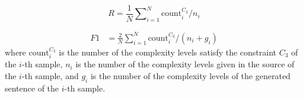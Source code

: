 \documentclass[11pt]{article}
\begin{document}
\begin{itemize}
\begin{equation}
R=\frac{1}{N}\sum\nolimits_{i=1}^{N}{\mathrm{count}_i^{C_3}}\big/{n_i}
\end{equation}

\begin{equation}
\begin{aligned}
F1&=\frac{2}{N}\sum\nolimits_{i=1}^{N}{\mathrm{count}_i^{C_3}}\big/({n_i}+{g_i})
\end{aligned}
\end{equation}
where $\mathrm{count}_i^{C_3}$ is the number of the complexity levels satisfy the constraint $C_3$ of the $i$-th sample, $n_i$ is the number of the complexity levels given in the source  of the $i$-th sample, and $g_i$ is the number of the complexity levels of the generated sentence of the $i$-th sample.
\end{itemize}
\end{document}
